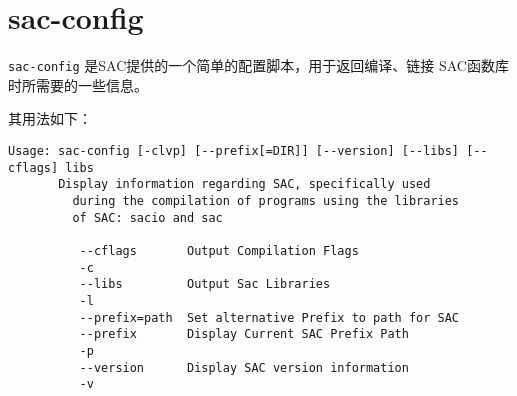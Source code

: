 \section{sac-config}
\label{sec:sac-config}

\texttt{sac-config} 是SAC提供的一个简单的配置脚本，用于返回编译、链接
SAC函数库时所需要的一些信息。

其用法如下：
\begin{verbatim}
Usage: sac-config [-clvp] [--prefix[=DIR]] [--version] [--libs] [--cflags] libs
       Display information regarding SAC, specifically used
         during the compilation of programs using the libraries
         of SAC: sacio and sac

          --cflags       Output Compilation Flags
          -c
          --libs         Output Sac Libraries
          -l
          --prefix=path  Set alternative Prefix to path for SAC
          --prefix       Display Current SAC Prefix Path
          -p
          --version      Display SAC version information
          -v
\end{verbatim}
